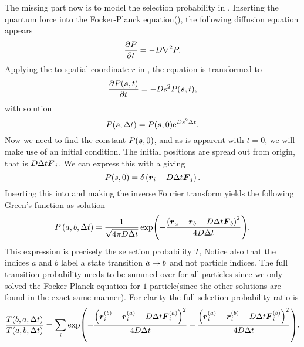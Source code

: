         The missing part now is to model the selection probability in
        . Inserting the quantum force into the
        Focker-Planck equation(), the following
        diffusion equation appears
            \begin{equation}
                \prd{t}[P] = -D\nabla^2 P.
                \label{eq:diffeqFP}
            \end{equation}
        Applying the  to spatial coordinate $r$ in
        , the equation is transformed to
            \begin{equation}
                \prd{t}[P(\blds{s},t)] = -Ds^2 P(\blds{s},t),
            \end{equation}
        with solution
            \begin{equation}
                P(\boldsymbol{{s}},\Delta t) = P(\boldsymbol{{s}},0)\mathrm{e}^{Ds^2\Delta t}.
                \label{eq:Punfin}
            \end{equation}
        Now we need to find the constant $P(\boldsymbol{{s}},0)$, and as is apparent
        with $t=0$, we will make use of an initial condition. The initial
        positions are spread out from origin, that is $D\Delta t\boldsymbol{{F}}_j$. We
        can express this with a \cite{GriffQuan,
        boasMath} giving
            \begin{equation}
                P(s,0) = \delta\left(\boldsymbol{{r}}_i - D\Delta t\boldsymbol{{F}}_j\right).
            \end{equation}
        Inserting this into  and making the inverse Fourier
        transform yields the following Green's function as solution
            \begin{equation}
                P\left(a, b, \Delta t\right) = \frac{1}{\sqrt{4\pi D\Delta t}}
                \exp(-\frac{\left(\boldsymbol{{r}}_a - \boldsymbol{{r}}_b - D\Delta t
                \boldsymbol{{F}}_b\right)^2}{4D\Delta t}).
            \end{equation}
        This expression is precisely the selection probability $T$, Notice also
        that the indices $a$ and $b$ label a state transition $a\rightarrow b$ and not
        particle indices. The full transition probability needs to be summed
        over for all particles since we only solved the Focker-Planck equation
        for $1$ particle(since the other solutions are found in the exact same
        manner). For clarity the full selection probability ratio is
            \begin{equation}
                \frac{T(b,a,\Delta t)}{T(a,b,\Delta t)} = \sum_i
                \exp(-\frac{\left(\boldsymbol{{r}}^{(b)}_i - \boldsymbol{{r}}^{(a)}_i - D\Delta
                t \boldsymbol{{F}}^{(a)}_i\right)^2}{4D\Delta t}
                +\frac{\left(\boldsymbol{{r}}^{(a)}_i - \boldsymbol{{r}}^{(b)}_i - D\Delta t
                \boldsymbol{{F}}^{(b)}_i\right)^2}{4D\Delta t}).
            \end{equation}

